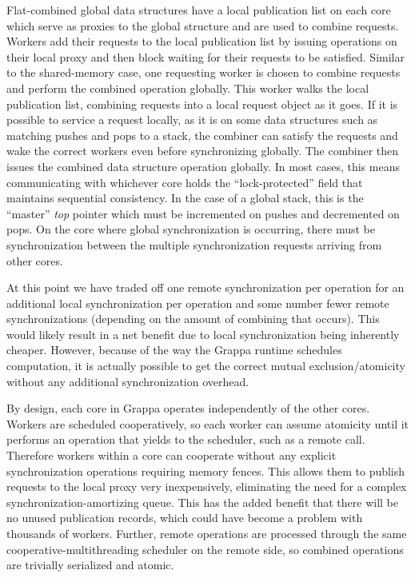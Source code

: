 Flat-combined global data structures have a local publication list on each core which serve as proxies to the global structure and are used to combine requests. Workers add their requests to the local publication list by issuing operations on their local proxy and then block waiting for their requests to be satisfied. Similar to the shared-memory case, one requesting worker is chosen to combine requests and perform the combined operation globally. This worker walks the local publication list, combining requests into a local request object as it goes. If it is possible to service a request locally, as it is on some data structures such as matching pushes and pops to a stack, the combiner can satisfy the requests and wake the correct workers even before synchronizing globally. The combiner then issues the combined data structure operation globally. In most cases, this means communicating with whichever core holds the ``lock-protected'' field that maintains sequential consistency. In the case of a global stack, this is the ``master'' \emph{top} pointer which must be incremented on pushes and decremented on pops. On the core where global synchronization is occurring, there must be synchronization between the multiple synchronization requests arriving from other cores.

At this point we have traded off one remote synchronization per operation for an additional local synchronization per operation and some number fewer remote synchronizations (depending on the amount of combining that occurs). This would likely result in a net benefit due to local synchronization being inherently cheaper. However, because of the way the Grappa runtime schedules computation, it is actually possible to get the correct mutual exclusion/atomicity without any additional synchronization overhead.

By design, each core in Grappa operates independently of the other cores. Workers are scheduled cooperatively, so each worker can assume atomicity until it performs an operation that yields to the scheduler, such as a remote call. Therefore workers within a core can cooperate without any explicit synchronization operations requiring memory fences. This allows them to publish requests to the local  proxy very inexpensively, eliminating the need for a complex synchronization-amortizing queue. This has the added benefit that there will be no unused publication records, which could have become a problem with thousands of workers. Further, remote operations are processed through the same cooperative-multithreading scheduler on the remote side, so combined operations are trivially serialized and atomic.

